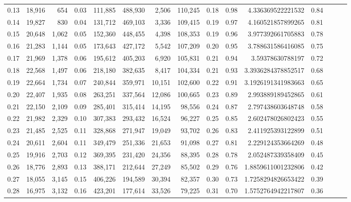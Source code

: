 \begin{tabular}{rrrrrrrrrrrrrrr}
0.13 &  18,916 &    654 &  0.03 &  111,885 &  488,930 &    2,506 &  110,245 &  0.18 &  0.98 &       4.336369522221532 &      0.84 \\
0.14 &  19,827 &    830 &  0.04 &  131,712 &  469,103 &    3,336 &  109,415 &  0.19 &  0.97 &       4.160521857899265 &      0.81 \\
0.15 &  20,648 &  1,062 &  0.05 &  152,360 &  448,455 &    4,398 &  108,353 &  0.19 &  0.96 &       3.977392661705883 &      0.78 \\
0.16 &  21,283 &  1,144 &  0.05 &  173,643 &  427,172 &    5,542 &  107,209 &  0.20 &  0.95 &       3.788631586416085 &      0.75 \\
0.17 &  21,969 &  1,378 &  0.06 &  195,612 &  405,203 &    6,920 &  105,831 &  0.21 &  0.94 &        3.59378630788197 &      0.72 \\
0.18 &  22,568 &  1,497 &  0.06 &  218,180 &  382,635 &    8,417 &  104,334 &  0.21 &  0.93 &      3.3936284378852517 &      0.68 \\
0.19 &  22,664 &  1,734 &  0.07 &  240,844 &  359,971 &   10,151 &  102,600 &  0.22 &  0.91 &      3.1926191341983663 &      0.65 \\
0.20 &  22,407 &  1,935 &  0.08 &  263,251 &  337,564 &   12,086 &  100,665 &  0.23 &  0.89 &       2.993889189452865 &      0.61 \\
0.21 &  22,150 &  2,109 &  0.09 &  285,401 &  315,414 &   14,195 &   98,556 &  0.24 &  0.87 &       2.797438603648748 &      0.58 \\
0.22 &  21,982 &  2,329 &  0.10 &  307,383 &  293,432 &   16,524 &   96,227 &  0.25 &  0.85 &       2.602478026802423 &      0.55 \\
0.23 &  21,485 &  2,525 &  0.11 &  328,868 &  271,947 &   19,049 &   93,702 &  0.26 &  0.83 &       2.411925393122899 &      0.51 \\
0.24 &  20,611 &  2,604 &  0.11 &  349,479 &  251,336 &   21,653 &   91,098 &  0.27 &  0.81 &       2.229124353664269 &      0.48 \\
0.25 &  19,916 &  2,703 &  0.12 &  369,395 &  231,420 &   24,356 &   88,395 &  0.28 &  0.78 &       2.052487339358409 &      0.45 \\
0.26 &  18,776 &  2,893 &  0.13 &  388,171 &  212,644 &   27,249 &   85,502 &  0.29 &  0.76 &      1.8859611001232806 &      0.42 \\
0.27 &  18,055 &  3,145 &  0.15 &  406,226 &  194,589 &   30,394 &   82,357 &  0.30 &  0.73 &      1.7258294826653422 &      0.39 \\
0.28 &  16,975 &  3,132 &  0.16 &  423,201 &  177,614 &   33,526 &   79,225 &  0.31 &  0.70 &      1.5752764942217807 &      0.36 \\

\end{tabular}
